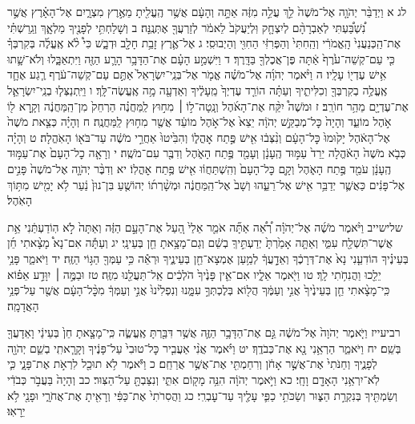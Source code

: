 \documentclass[twoside, openany, parskip=half, 11pt]{book}
\begin{document}
לג א וַיְדַבֵּ֨ר יְהֹוָ֤ה אֶל־מֹשֶׁה֙ לֵ֣ךְ עֲלֵ֣ה מִזֶּ֔ה אַתָּ֣ה וְהָעָ֔ם אֲשֶׁ֥ר הֶֽעֱלִ֖יתָ מֵאֶ֣רֶץ מִצְרָ֑יִם אֶל־הָאָ֗רֶץ אֲשֶׁ֣ר נִ֠שְׁבַּ֠עְתִּי לְאַבְרָהָ֨ם לְיִצְחָ֤ק וּֽלְיַעֲקֹב֙ לֵאמֹ֔ר לְזַרְעֲךָ֖ אֶתְּנֶֽנָּה׃ ב וְשָׁלַחְתִּ֥י לְפָנֶ֖יךָ מַלְאָ֑ךְ וְגֵֽרַשְׁתִּ֗י אֶת־הַֽכְּנַעֲנִי֙ הָֽאֱמֹרִ֔י וְהַֽחִתִּי֙ וְהַפְּרִזִּ֔י הַחִוִּ֖י וְהַיְבוּסִֽי׃ ג אֶל־אֶ֛רֶץ זָבַ֥ת חָלָ֖ב וּדְבָ֑שׁ כִּי֩ לֹ֨א אֶֽעֱלֶ֜ה בְּקִרְבְּךָ֗ כִּ֤י עַם־קְשֵׁה־עֹ֙רֶף֙ אַ֔תָּה פֶּן־אֲכֶלְךָ֖ בַּדָּֽרֶךְ׃ ד וַיִּשְׁמַ֣ע הָעָ֗ם אֶת־הַדָּבָ֥ר הָרָ֛ע הַזֶּ֖ה וַיִּתְאַבָּ֑לוּ וְלֹא־שָׁ֛תוּ אִ֥ישׁ עֶדְי֖וֹ עָלָֽיו׃ ה וַיֹּ֨אמֶר יְהֹוָ֜ה אֶל־מֹשֶׁ֗ה אֱמֹ֤ר אֶל־בְּנֵֽי־יִשְׂרָאֵל֙ אַתֶּ֣ם עַם־קְשֵׁה־עֹ֔רֶף רֶ֧גַע אֶחָ֛ד אֶֽעֱלֶ֥ה בְקִרְבְּךָ֖ וְכִלִּיתִ֑יךָ וְעַתָּ֗ה הוֹרֵ֤ד עֶדְיְךָ֙ מֵֽעָלֶ֔יךָ וְאֵדְעָ֖ה מָ֥ה אֶֽעֱשֶׂה־לָּֽךְ׃ ו וַיִּֽתְנַצְּל֧וּ בְנֵֽי־יִשְׂרָאֵ֛ל אֶת־עֶדְיָ֖ם מֵהַ֥ר חוֹרֵֽב׃ ז וּמֹשֶׁה֩ יִקַּ֨ח אֶת־הָאֹ֜הֶל וְנָֽטָה־ל֣וֹ ׀ מִח֣וּץ לַֽמַּחֲנֶ֗ה הַרְחֵק֙ מִן־הַֽמַּחֲנֶ֔ה וְקָ֥רָא ל֖וֹ אֹ֣הֶל מוֹעֵ֑ד וְהָיָה֙ כׇּל־מְבַקֵּ֣שׁ יְהֹוָ֔ה יֵצֵא֙ אֶל־אֹ֣הֶל מוֹעֵ֔ד אֲשֶׁ֖ר מִח֥וּץ לַֽמַּחֲנֶֽה׃ ח וְהָיָ֗ה כְּצֵ֤את מֹשֶׁה֙ אֶל־הָאֹ֔הֶל יָק֙וּמוּ֙ כׇּל־הָעָ֔ם וְנִ֨צְּב֔וּ אִ֖ישׁ פֶּ֣תַח אׇהֳל֑וֹ וְהִבִּ֙יטוּ֙ אַחֲרֵ֣י מֹשֶׁ֔ה עַד־בֹּא֖וֹ הָאֹֽהֱלָה׃ ט וְהָיָ֗ה כְּבֹ֤א מֹשֶׁה֙ הָאֹ֔הֱלָה יֵרֵד֙ עַמּ֣וּד הֶֽעָנָ֔ן וְעָמַ֖ד פֶּ֣תַח הָאֹ֑הֶל וְדִבֶּ֖ר עִם־מֹשֶֽׁה׃ י וְרָאָ֤ה כׇל־הָעָם֙ אֶת־עַמּ֣וּד הֶֽעָנָ֔ן עֹמֵ֖ד פֶּ֣תַח הָאֹ֑הֶל וְקָ֤ם כׇּל־הָעָם֙ וְהִֽשְׁתַּחֲו֔וּ אִ֖ישׁ פֶּ֥תַח אׇהֳלֽוֹ׃ יא וְדִבֶּ֨ר יְהֹוָ֤ה אֶל־מֹשֶׁה֙ פָּנִ֣ים אֶל־פָּנִ֔ים כַּאֲשֶׁ֛ר יְדַבֵּ֥ר אִ֖ישׁ אֶל־רֵעֵ֑הוּ וְשָׁב֙ אֶל־הַֽמַּחֲנֶ֔ה וּמְשָׁ֨רְת֜וֹ יְהוֹשֻׁ֤עַ בִּן־נוּן֙ נַ֔עַר לֹ֥א יָמִ֖ישׁ מִתּ֥וֹךְ הָאֹֽהֶל׃

שלישייב וַיֹּ֨אמֶר מֹשֶׁ֜ה אֶל־יְהֹוָ֗ה רְ֠אֵ֠ה אַתָּ֞ה אֹמֵ֤ר אֵלַי֙ הַ֚עַל אֶת־הָעָ֣ם הַזֶּ֔ה וְאַתָּה֙ לֹ֣א הֽוֹדַעְתַּ֔נִי אֵ֥ת אֲשֶׁר־תִּשְׁלַ֖ח עִמִּ֑י וְאַתָּ֤ה אָמַ֙רְתָּ֙ יְדַעְתִּ֣יךָֽ בְשֵׁ֔ם וְגַם־מָצָ֥אתָ חֵ֖ן בְּעֵינָֽי׃ יג וְעַתָּ֡ה אִם־נָא֩ מָצָ֨אתִי חֵ֜ן בְּעֵינֶ֗יךָ הוֹדִעֵ֤נִי נָא֙ אֶת־דְּרָכֶ֔ךָ וְאֵדָ֣עֲךָ֔ לְמַ֥עַן אֶמְצָא־חֵ֖ן בְּעֵינֶ֑יךָ וּרְאֵ֕ה כִּ֥י עַמְּךָ֖ הַגּ֥וֹי הַזֶּֽה׃ יד וַיֹּאמַ֑ר פָּנַ֥י יֵלֵ֖כוּ וַהֲנִחֹ֥תִי לָֽךְ׃ טו וַיֹּ֖אמֶר אֵלָ֑יו אִם־אֵ֤ין פָּנֶ֙יךָ֙ הֹלְכִ֔ים אַֽל־תַּעֲלֵ֖נוּ מִזֶּֽה׃ טז וּבַמֶּ֣ה ׀ יִוָּדַ֣ע אֵפ֗וֹא כִּֽי־מָצָ֨אתִי חֵ֤ן בְּעֵינֶ֙יךָ֙ אֲנִ֣י וְעַמֶּ֔ךָ הֲל֖וֹא בְּלֶכְתְּךָ֣ עִמָּ֑נוּ וְנִפְלִ֙ינוּ֙ אֲנִ֣י וְעַמְּךָ֔ מִכׇּ֨ל־הָעָ֔ם אֲשֶׁ֖ר עַל־פְּנֵ֥י הָאֲדָמָֽה׃

רביעייז וַיֹּ֤אמֶר יְהֹוָה֙ אֶל־מֹשֶׁ֔ה גַּ֣ם אֶת־הַדָּבָ֥ר הַזֶּ֛ה אֲשֶׁ֥ר דִּבַּ֖רְתָּ אֶֽעֱשֶׂ֑ה כִּֽי־מָצָ֤אתָ חֵן֙ בְּעֵינַ֔י וָאֵדָעֲךָ֖ בְּשֵֽׁם׃ יח וַיֹּאמַ֑ר הַרְאֵ֥נִי נָ֖א אֶת־כְּבֹדֶֽךָ׃ יט וַיֹּ֗אמֶר אֲנִ֨י אַעֲבִ֤יר כׇּל־טוּבִי֙ עַל־פָּנֶ֔יךָ וְקָרָ֧אתִֽי בְשֵׁ֛ם יְהֹוָ֖ה לְפָנֶ֑יךָ וְחַנֹּתִי֙ אֶת־אֲשֶׁ֣ר אָחֹ֔ן וְרִחַמְתִּ֖י אֶת־אֲשֶׁ֥ר אֲרַחֵֽם׃ כ וַיֹּ֕אמֶר לֹ֥א תוּכַ֖ל לִרְאֹ֣ת אֶת־פָּנָ֑י כִּ֛י לֹֽא־יִרְאַ֥נִי הָאָדָ֖ם וָחָֽי׃ כא וַיֹּ֣אמֶר יְהֹוָ֔ה הִנֵּ֥ה מָק֖וֹם אִתִּ֑י וְנִצַּבְתָּ֖ עַל־הַצּֽוּר׃ כב וְהָיָה֙ בַּעֲבֹ֣ר כְּבֹדִ֔י וְשַׂמְתִּ֖יךָ בְּנִקְרַ֣ת הַצּ֑וּר וְשַׂכֹּתִ֥י כַפִּ֛י עָלֶ֖יךָ עַד־עׇבְרִֽי׃ כג וַהֲסִרֹתִי֙ אֶת־כַּפִּ֔י וְרָאִ֖יתָ אֶת־אֲחֹרָ֑י וּפָנַ֖י לֹ֥א יֵרָאֽוּ׃
\end{document}

